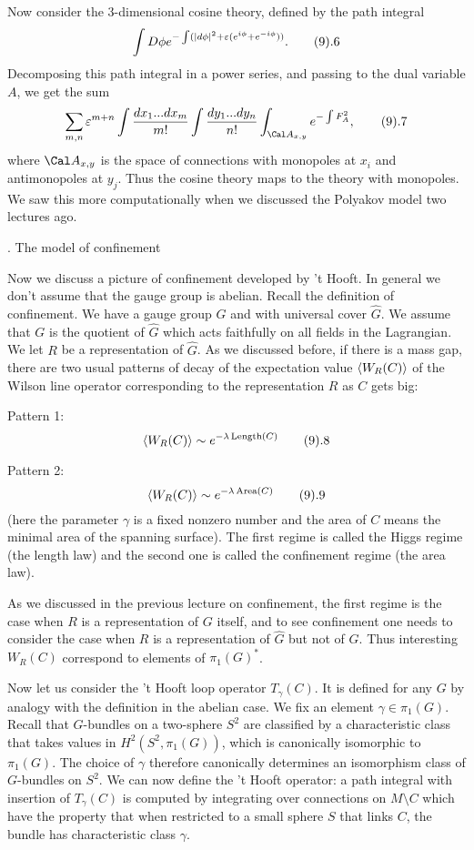 Now consider the 3-dimensional cosine theory, defined by the path integral 
$$
\int D\phi e^{-\int (|d\phi|^2+\e(e^{i\phi}+e^{-i\phi}))}.\tag 9.6
$$
Decomposing this path integral in a power series, and passing to the dual 
variable $A$, we get the sum 
$$
\sum_{m,n}\e^{m+n}\int \frac{dx_1...dx_m}{m!}\int \frac{dy_1...dy_n}{n!}
\int_{\Cal A_{x,y}} e^{-\int F_A^2},\tag 9.7
$$
where $\Cal A_{x,y}$ is the space of connections with monopoles 
at $x_i$ and antimonopoles at $y_j$. Thus the cosine theory maps to 
the theory with monopoles. We saw this more computationally 
when we discussed the Polyakov model two lectures ago. 

. The model of confinement
\endhead

Now we discuss a picture of confinement developed by 't Hooft. 
In general we don't assume that the gauge group is abelian. 
Recall the definition of confinement.
We have a gauge group $G$ and with universal cover $\widehat G$. 
We assume that
 $G$ is the quotient of $\widehat G$ 
which acts faithfully on all fields in the Lagrangian.
We let $R$ be a representation of $\widehat G$. 
As we discussed before, if there is a mass gap, 
there are two usual patterns of decay 
of the expectation value $\langle W_R(C)\rangle$ of the Wilson line operator 
corresponding to the representation $R$ as $C$ gets big:

Pattern 1:
$$
\<W_R(C)\>\sim 
e^{-\l \,\text{Length}(C)}\tag 9.8
$$

Pattern 2:
$$
\<W_R(C)\>\sim 
 e^{-\l\, \text{Area}(C)}\tag 9.9
$$
(here the parameter $\gamma$ is a fixed nonzero number and 
the area of $C$ means the minimal area of the spanning surface).  
The first regime is called the Higgs regime (the length law) 
and the second one is called the 
confinement regime (the area law). 

As we discussed in the previous lecture on confinement, the first regime is 
the case when $R$ is a representation of $G$ itself, and to see confinement 
one needs to consider 
the case when $R$ is a representation of $\widehat G$ but not of $G$. 
Thus interesting $W_R(C)$ correspond to elements of $\pi_1(G)^*$. 

Now let us consider the 't Hooft loop operator $T_\gamma(C)$.  It
is defined for any $G$ by analogy with the definition in the abelian
case.  We fix an element $\gamma\in \pi_1(G)$.  Recall that 
$G$-bundles on a two-sphere $S^2$ are classified by a characteristic class
that takes values in $H^2(S^2,\pi_1(G))$, which is canonically
isomorphic to $\pi_1(G)$.  The choice of $\gamma$ therefore canonically
determines an isomorphism class of $G$-bundles on $S^2$. We can now
define the 't Hooft operator: a path integral
with insertion of $T_\gamma(C)$ is computed by integrating over
connections on $M\setminus C$ which have the property that when restricted
to a small sphere $S$ that links $C$, the bundle has characteristic class
$\gamma$.


